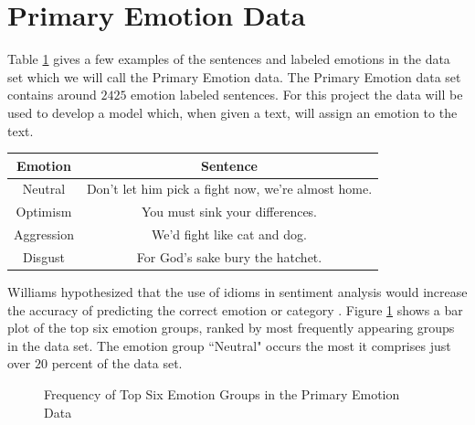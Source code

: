 \documentclass[titlepage,letterpaper]{article}
\begin{document}
\section{Primary Emotion Data}
Table \ref{PrimaryEmotionTable} gives a few examples of the sentences and labeled emotions in the data set which we will call the Primary Emotion data. The Primary Emotion data set contains around $2425$ emotion labeled sentences. For this project the data will be used to develop a model which, when given a text, will assign an emotion to the text. 
 \begin{table}
 \begin{center}
 	 	\label{PrimaryEmotionTable}
 	\begin{tabular}{ |c|c| } 
 		\hline
 		Emotion & Sentence \\
 		\hline \hline
 		Neutral & Don't let him pick a fight now, we're almost home. \\
 		\hline
 		Optimism &  You must sink your differences. \\
 		\hline
 		Aggression & We'd fight like cat and dog.  \\ 
 		\hline
 		Disgust & For God's sake bury the hatchet. \\
 		\hline
 	\end{tabular}
 \end{center}
\end{table}
 
 Williams hypothesized that the use of idioms in sentiment analysis would increase the accuracy of predicting the correct emotion or category \cite{lowriwilliams}. Figure \ref{topsixgroups} shows a bar plot of the top six emotion groups, ranked by most frequently appearing groups in the data set. The emotion group ``Neutral" occurs the most it comprises just over $20$ percent of the data set. 
 
 

 \begin{figure}[htb]
		\centering
 		
 		\caption{Frequency of Top Six Emotion Groups in the Primary Emotion Data}
 		\label{topsixgroups}
 \end{figure}
 	
 
\end{document}
